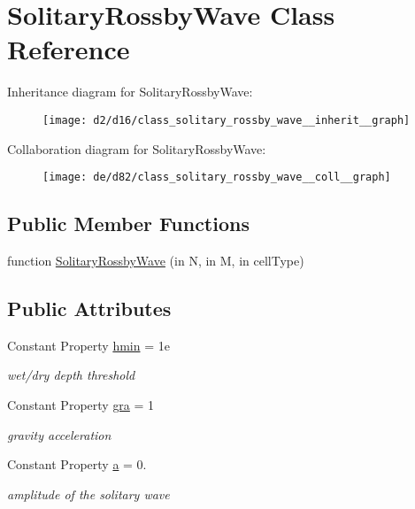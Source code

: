 \hypertarget{class_solitary_rossby_wave}{}\section{Solitary\+Rossby\+Wave Class Reference}
\label{class_solitary_rossby_wave}


Inheritance diagram for Solitary\+Rossby\+Wave\+:
\nopagebreak
\begin{figure}[H]
\begin{center}
\leavevmode
\texttt{[image: d2/d16/class\_solitary\_rossby\_wave\_\_inherit\_\_graph]}
\end{center}
\end{figure}


Collaboration diagram for Solitary\+Rossby\+Wave\+:
\nopagebreak
\begin{figure}[H]
\begin{center}
\leavevmode
\texttt{[image: de/d82/class\_solitary\_rossby\_wave\_\_coll\_\_graph]}
\end{center}
\end{figure}
\subsection*{Public Member Functions}
\begin{DoxyCompactItemize}
\item 
function \hyperlink{class_solitary_rossby_wave_a713d9be5cbaf72bcfa7c7bb8f8ecdd3c}{Solitary\+Rossby\+Wave} (in N, in M, in cell\+Type)
\end{DoxyCompactItemize}
\subsection*{Public Attributes}
\begin{DoxyCompactItemize}
\item 
Constant Property \hyperlink{class_solitary_rossby_wave_a83d04b904067cea3cf2d9a29c8c2cfdd}{hmin} = 1e
\begin{DoxyCompactList}\small\item\em wet/dry depth threshold \end{DoxyCompactList}\item 
Constant Property \hyperlink{class_solitary_rossby_wave_a546459aa28281ca935b4b72d479df810}{gra} = 1
\begin{DoxyCompactList}\small\item\em gravity acceleration \end{DoxyCompactList}\item 
Constant Property \hyperlink{class_solitary_rossby_wave_a837c57dee92d4833d927352b2dca6790}{a} = 0.
\begin{DoxyCompactList}\small\item\em amplitude of the solitary wave \end{DoxyCompactList}\end{DoxyCompactItemize}
